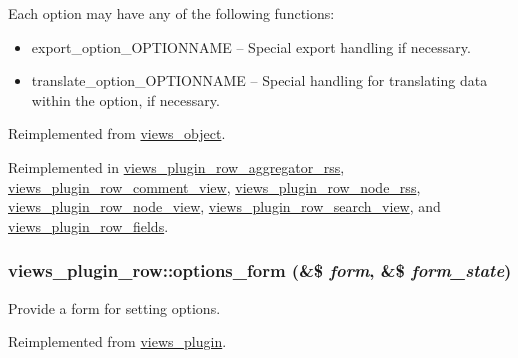  Each option may have any of the following functions:\begin{itemize}
\item export\_\-option\_\-OPTIONNAME -- Special export handling if necessary.\item translate\_\-option\_\-OPTIONNAME -- Special handling for translating data within the option, if necessary. \end{itemize}


Reimplemented from \hyperlink{classviews__object_b0753d0001c8c9ff98beee696b4516ba}{views\_\-object}.

Reimplemented in \hyperlink{classviews__plugin__row__aggregator__rss_653e8ed46f98dbbc630b58bb7212f617}{views\_\-plugin\_\-row\_\-aggregator\_\-rss}, \hyperlink{classviews__plugin__row__comment__view_ec46add7efd08b097100a4cc6d60b50e}{views\_\-plugin\_\-row\_\-comment\_\-view}, \hyperlink{classviews__plugin__row__node__rss_160237bd0d2f6ee0e9c22cf7d08d8082}{views\_\-plugin\_\-row\_\-node\_\-rss}, \hyperlink{classviews__plugin__row__node__view_f489a0ff40c6b85382d9611cce0c509b}{views\_\-plugin\_\-row\_\-node\_\-view}, \hyperlink{classviews__plugin__row__search__view_c0117a0bbff00e4833a081abb564dbf0}{views\_\-plugin\_\-row\_\-search\_\-view}, and \hyperlink{classviews__plugin__row__fields_85538eaa61f4a19de68a693876137934}{views\_\-plugin\_\-row\_\-fields}.\hypertarget{classviews__plugin__row_6914c39d64977a0aa71da39cc1af004e}{
\subsubsection[{options\_\-form}]{\setlength{\rightskip}{0pt plus 5cm}views\_\-plugin\_\-row::options\_\-form (\&\$ {\em form}, \/  \&\$ {\em form\_\-state})}}
\label{classviews__plugin__row_6914c39d64977a0aa71da39cc1af004e}


Provide a form for setting options. 

Reimplemented from \hyperlink{classviews__plugin_1aaed8da1afd9f45293a37358c159837}{views\_\-plugin}.

